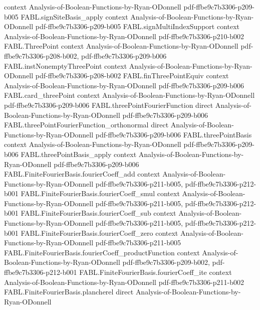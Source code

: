 \begin{theorem}
  {context}
  {Analysis-of-Boolean-Functions-by-Ryan-ODonnell}
  {pdf-ffbe9c7b3306-p209-b005}
\proofstep
  {FABL.signSiteBasis_apply}
  {context}
  {Analysis-of-Boolean-Functions-by-Ryan-ODonnell}
  {pdf-ffbe9c7b3306-p209-b005}
\proofstep
  {FABL.signMultiIndexSupport}
  {context}
  {Analysis-of-Boolean-Functions-by-Ryan-ODonnell}
  {pdf-ffbe9c7b3306-p210-b002}
\proofstep
  {FABL.ThreePoint}
  {context}
  {Analysis-of-Boolean-Functions-by-Ryan-ODonnell}
  {pdf-ffbe9c7b3306-p208-b002,
    pdf-ffbe9c7b3306-p209-b006}
\proofstep
  {FABL.instNonemptyThreePoint}
  {context}
  {Analysis-of-Boolean-Functions-by-Ryan-ODonnell}
  {pdf-ffbe9c7b3306-p208-b002}
\proofstep
  {FABL.finThreePointEquiv}
  {context}
  {Analysis-of-Boolean-Functions-by-Ryan-ODonnell}
  {pdf-ffbe9c7b3306-p209-b006}
\proofstep
  {FABL.card_threePoint}
  {context}
  {Analysis-of-Boolean-Functions-by-Ryan-ODonnell}
  {pdf-ffbe9c7b3306-p209-b006}
\proofstep
  {FABL.threePointFourierFunction}
  {direct}
  {Analysis-of-Boolean-Functions-by-Ryan-ODonnell}
  {pdf-ffbe9c7b3306-p209-b006}
\proofstep
  {FABL.threePointFourierFunction_orthonormal}
  {direct}
  {Analysis-of-Boolean-Functions-by-Ryan-ODonnell}
  {pdf-ffbe9c7b3306-p209-b006}
\proofstep
  {FABL.threePointBasis}
  {context}
  {Analysis-of-Boolean-Functions-by-Ryan-ODonnell}
  {pdf-ffbe9c7b3306-p209-b006}
\proofstep
  {FABL.threePointBasis_apply}
  {context}
  {Analysis-of-Boolean-Functions-by-Ryan-ODonnell}
  {pdf-ffbe9c7b3306-p209-b006}
\proofstep
  {FABL.FiniteFourierBasis.fourierCoeff_add}
  {context}
  {Analysis-of-Boolean-Functions-by-Ryan-ODonnell}
  {pdf-ffbe9c7b3306-p211-b005,
    pdf-ffbe9c7b3306-p212-b001}
\proofstep
  {FABL.FiniteFourierBasis.fourierCoeff_smul}
  {context}
  {Analysis-of-Boolean-Functions-by-Ryan-ODonnell}
  {pdf-ffbe9c7b3306-p211-b005,
    pdf-ffbe9c7b3306-p212-b001}
\proofstep
  {FABL.FiniteFourierBasis.fourierCoeff_sub}
  {context}
  {Analysis-of-Boolean-Functions-by-Ryan-ODonnell}
  {pdf-ffbe9c7b3306-p211-b005,
    pdf-ffbe9c7b3306-p212-b001}
\proofstep
  {FABL.FiniteFourierBasis.fourierCoeff_zero}
  {context}
  {Analysis-of-Boolean-Functions-by-Ryan-ODonnell}
  {pdf-ffbe9c7b3306-p211-b005}
\proofstep
  {FABL.FiniteFourierBasis.fourierCoeff_productFunction}
  {context}
  {Analysis-of-Boolean-Functions-by-Ryan-ODonnell}
  {pdf-ffbe9c7b3306-p209-b002,
    pdf-ffbe9c7b3306-p212-b001}
\proofstep
  {FABL.FiniteFourierBasis.fourierCoeff_ite}
  {context}
  {Analysis-of-Boolean-Functions-by-Ryan-ODonnell}
  {pdf-ffbe9c7b3306-p211-b002}
\proofstep
  {FABL.FiniteFourierBasis.plancherel}
  {direct}
  {Analysis-of-Boolean-Functions-by-Ryan-ODonnell}

\end{theorem}
